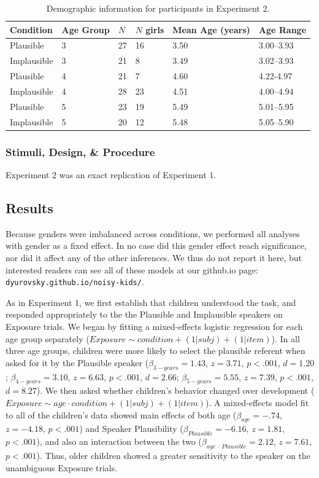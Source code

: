 \documentclass[man,floatsintext]{apa6}
\begin{document}
\begin{table}[tb]
\begin{center}
\begin{tabular}{llllll}
 Condition & Age Group & $N$ & $N$ girls & Mean Age (years) & Age Range\\ 
  \hline
  Plausible & 3 & 27 & 16 & 3.50 & 3.00--3.93 \\ 
  Implausible & 3 & 21 & 8 & 3.49 & 3.02--3.93 \\ 
  Plausible & 4 & 21 & 7 & 4.60 & 4.22-4.97 \\ 
  Implausible & 4 & 28 & 23 & 4.51 & 4.00--4.94 \\ 
  Plausible & 5 & 23 & 19 & 5.49 & 5.01--5.95 \\ 
  Implausible & 5 & 20 & 12 & 5.48 & 5.05--5.90 \\ 
   \hline
\end{tabular}\end{center}
\vspace{6pt}
\caption{\label{tab:exp2_demos}Demographic information for participants in Experiment 2.}
\end{table}

\subsubsection{Stimuli, Design, \& Procedure}

Experiment 2 was an exact replication of Experiment 1.

\subsection{Results}

Because genders were imbalanced across conditions, we performed all analyses with gender as a fixed effect. In no case did this gender effect reach significance, nor did it affect any of the other inferences. We thus do not report it here, but interested readers can see all of these models at our github.io page: {\small \tt{dyurovsky.github.io/noisy-kids/}}. 

As in Experiment 1, we first establish that children understood the task, and responded appropriately to the  the Plausible and Implausible speakers on Exposure trials. We began by fitting a mixed-effects logistic regression for each age group separately ($Exposure \sim condition + (1|subj) + (1|item)$). In all three age groups, children were more likely to select the plausible referent when asked for it by the Plausible speaker ($\beta_{3-years} = 1.43$, $z = 3.71$, $p < .001$, $d = 1.20$; $\beta_{4-years} = 3.10$, $z = 6.63$, $p < .001$, $d = 2.66$; $\beta_{5-years} = 5.55$, $z = 7.39$, $p < .001$, $d = 8.27$). We then asked whether children's behavior changed over development ($Exposure \sim age \cdot condition + (1|subj) + (1|item)$). A mixed-effects model fit to all of the children's data showed main effects of both age ($\beta_{age} = -.74$, $z = -4.18$, $p < .001$) and Speaker Plausibility ($\beta_{Plausible} = -6.16$, $z = 1.81$, $p < .001$), and also an interaction between the two ($\beta_{age \: \cdot \: Plausible} = 2.12$, $z = 7.61$, $p < .001$). Thus, older children showed a greater sensitivity to the speaker on the unambiguous Exposure trials.
\end{document}

